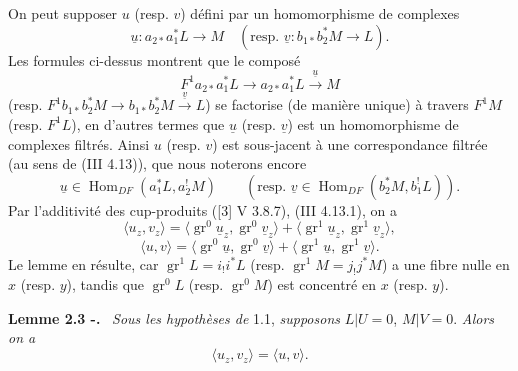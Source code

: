 \documentclass[11pt]{article}
\newenvironment{statement}[1]{\par\medskip\noindent\textbf{#1.}\ }{\par\medskip}
\DeclareMathOperator{\Hom}{Hom}
\providecommand{\Hom}{\operatorname{Hom}}
\providecommand{\Hom}{\operatorname{Hom}}
\begin{document}
On peut supposer $u$ (resp. $v$) défini par un homomorphisme de complexes
\[
\underline{u}:a_{2*}a_1^*L\longrightarrow M
\quad
(\text{resp. }\underline{v}:b_{1*}b_2^*M\longrightarrow L).
\]
Les formules ci-dessus montrent que le composé
\[
F^1a_{2*}a_1^*L\longrightarrow a_{2*}a_1^*L\xrightarrow{\underline{u}}M
\]
(resp. $F^1b_{1*}b_2^*M\to b_{1*}b_2^*M\xrightarrow{\underline{v}}L$) se factorise (de manière unique) à travers $F^1M$ (resp. $F^1L$), en d'autres termes que $\underline{u}$ (resp. $\underline{v}$) est un homomorphisme de complexes filtrés. Ainsi $u$ (resp. $v$) est sous-jacent à une correspondance filtrée (au sens de (III 4.13)), que nous noterons encore
\[
\underline{u}\in\Hom_{DF}(a_1^*L,a_2^!M)\qquad
(\text{resp. }\underline{v}\in\Hom_{DF}(b_2^*M,b_1^!L)).
\]
Par l'additivité des cup-produits ([3] V 3.8.7), (III 4.13.1), on a
\[
\langle u_z,v_z\rangle
 =\langle \operatorname{gr}^0\underline{u}_z,\operatorname{gr}^0\underline{v}_z\rangle
 +\langle \operatorname{gr}^1\underline{u}_z,\operatorname{gr}^1\underline{v}_z\rangle,
\]
\[
\langle u,v\rangle
 =\langle \operatorname{gr}^0\underline{u},\operatorname{gr}^0\underline{v}\rangle
 +\langle \operatorname{gr}^1\underline{u},\operatorname{gr}^1\underline{v}\rangle.
\]
Le lemme en résulte, car $\operatorname{gr}^1L=i_!i^*L$ (resp. $\operatorname{gr}^1M=j_!j^*M$) a une fibre nulle en $x$ (resp. $y$), tandis que $\operatorname{gr}^0L$ (resp. $\operatorname{gr}^0M$) est concentré en $x$ (resp. $y$).

\begin{statement}{Lemme 2.3 -}
\emph{Sous les hypothèses de} 1.1, \emph{supposons} $L|U=0$, $M|V=0$. \emph{Alors on a}
\[
\langle u_z,v_z\rangle=\langle u,v\rangle .
\]
\end{statement}
\end{document}
